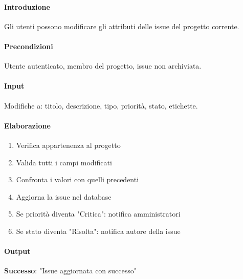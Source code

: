 \vspace{0.5cm}

\newpage


\begin{reqbox}[title=REQ-FUN-12: Modifica Issue]
\label{subsubsec:req-modifica-issue}

\paragraph{Introduzione}
Gli utenti possono modificare gli attributi delle issue del progetto corrente.

\paragraph{Precondizioni}
Utente autenticato, membro del progetto, issue non archiviata.

\paragraph{Input}
Modifiche a: titolo, descrizione, tipo, priorità, stato, etichette.

\paragraph{Elaborazione}
\begin{enumerate}[leftmargin=1.1em]
\item Verifica appartenenza al progetto
\item Valida tutti i campi modificati
\item Confronta i valori con quelli precedenti
\item Aggiorna la issue nel database
\item Se priorità diventa "Critica": notifica amministratori
\item Se stato diventa "Risolta": notifica autore della issue
\end{enumerate}

\paragraph{Output}
\textbf{Successo}: "Issue aggiornata con successo"

\end{reqbox}

